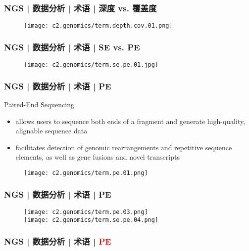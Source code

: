 \begin{frame}
  \frametitle{NGS | 数据分析 | 术语 | 深度 vs. 覆盖度}
  \begin{figure}
    \centering
    \texttt{[image: c2.genomics/term.depth.cov.01.png]}
  \end{figure}
\end{frame}

\begin{frame}
  \frametitle{NGS | 数据分析 | 术语 | SE vs. PE}
  \begin{figure}
    \centering
    \texttt{[image: c2.genomics/term.se.pe.01.jpg]}
  \end{figure}
\end{frame}

\begin{frame}
  \frametitle{NGS | 数据分析 | 术语 | PE}
  \begin{block}{Paired-End Sequencing}
    \begin{itemize}
      \item allows users to sequence both ends of a fragment and generate high-quality, alignable sequence data
      \item facilitates detection of genomic rearrangements and repetitive sequence elements, as well as gene fusions and novel transcripts
    \end{itemize}
  \end{block}
  \begin{figure}
    \centering
    \texttt{[image: c2.genomics/term.pe.01.png]}
  \end{figure}
\end{frame}

\begin{frame}
  \frametitle{NGS | 数据分析 | 术语 | PE}
  \begin{figure}
    \centering
    \texttt{[image: c2.genomics/term.pe.03.png]}\\
    \vspace{1em}
    \texttt{[image: c2.genomics/term.se.pe.04.png]}
  \end{figure}
\end{frame}

\begin{frame}
  \frametitle{NGS | 数据分析 | 术语 | \textcolor{red}{PE}}
  \begin{figure}
    \centering
    \\
    \vspace{1em}
  \end{figure}
\end{frame}

